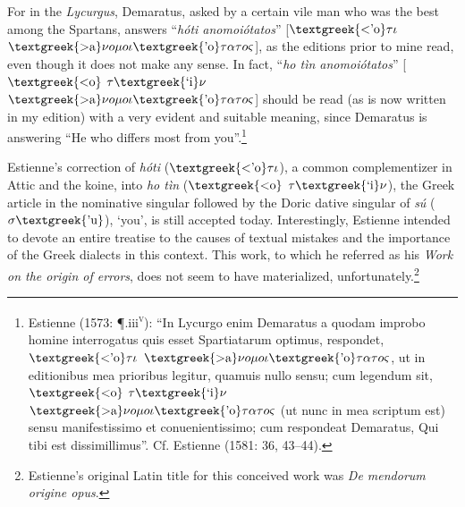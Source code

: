 \begin{styleQuote}
For in the \textit{Lycurgus}, Demaratus, asked by a certain vile man who was the best among the Spartans, answers “\textit{hóti anomoiótatos}” [$\text{\textgreek{<'o}}\tau \iota $ $\text{\textgreek{>a}}\nu o\mu o\iota \text{\textgreek{'o}}\tau \alpha \tau o\varsigma $], as the editions prior to mine read, even though it does not make any sense. In fact, “\textit{ho tìn anomoiótatos}” [$\text{\textgreek{<o}}$ $\tau \text{\textgreek{`i}}\nu $ $\text{\textgreek{>a}}\nu o\mu o\iota \text{\textgreek{'o}}\tau \alpha \tau o\varsigma $] should be read (as is now written in my edition) with a very evident and suitable meaning, since Demaratus is answering “He who differs most from you”.\footnote{ Estienne (1573: ¶.iii\textsc{\textsuperscript{v}}): “In Lycurgo enim Demaratus a quodam improbo homine interrogatus quis esset Spartiatarum optimus, respondet, $\text{\textgreek{<'o}}\tau \iota $ $\text{\textgreek{>a}}\nu o\mu o\iota \text{\textgreek{'o}}\tau \alpha \tau o\varsigma $, ut in editionibus mea prioribus legitur, quamuis nullo sensu; cum legendum sit, $\text{\textgreek{<o}}$ $\tau \text{\textgreek{`i}}\nu $ $\text{\textgreek{>a}}\nu o\mu o\iota \text{\textgreek{'o}}\tau \alpha \tau o\varsigma $ (ut nunc in mea scriptum est) sensu manifestissimo et conuenientissimo; cum respondeat Demaratus, Qui tibi est dissimillimus”. Cf. Estienne (1581: 36, 43–44).}
\end{styleQuote}

\begin{styleStandard}
Estienne’s correction of \textit{hóti }($\text{\textgreek{<'o}}\tau \iota $), a common complementizer in Attic and the koine, into \textit{ho tìn} ($\text{\textgreek{<o}}$ $\tau \text{\textgreek{`i}}\nu $), the Greek article in the nominative singular followed by the Doric dative singular of \textit{sú} ($\sigma \text{\textgreek{'u}}$), ‘you’, is still accepted today. Interestingly, Estienne intended to devote an entire treatise to the causes of textual mistakes and the importance of the Greek dialects in this context. This work, to which he referred as his \textit{Work on the origin of errors}, does not seem to have materialized, unfortunately.\footnote{ Estienne’s original Latin title for this conceived work was \textit{De mendorum origine opus}.}
\end{styleStandard}

